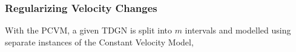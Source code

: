 \subsubsection{Regularizing Velocity Changes}
\label{sec:Method:ProposedModel:Regularization}

With the PCVM, a given TDGN is split into $m$ intervals and modelled using separate instances of the Constant Velocity Model, 



